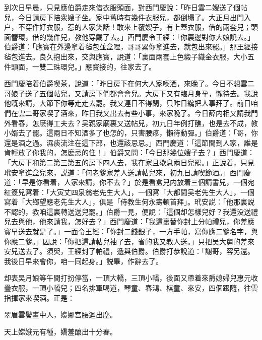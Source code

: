 到次日早晨，只見應伯爵走來借衣服頭面，對西門慶說：「昨日雲二嫂送了個帖兒，今日請房下陪衆嫂子坐。家中舊時有幾件衣服兒，都倒塌了。大正月出門入户，不穿件好衣服，惹的人家笑話！敢來上覆嫂子，有上蓋衣服，借的兩套兒；頭面簪環，借的幾件兒，教他穿戴了去。」西門慶令王經：「你裏邊對你大娘說去。」伯爵道：「應寳在外邊拿着毡包並盒哩，哥哥累你拿進去，就包出來罷。」那王經接毡包進去。良久抱出來，交與應寳，說道：「裏面兩套上色緞子織金衣服，大小五件頭面，一雙二珠環兒。」應寳接的，往家去了。

西門慶陪着伯爵喫茶，說道：「昨日房下在何大人家喫酒，來晚了。今日不想雲二哥娘子送了五個帖兒，又請房下們都會會兒。大房下又有臨月身孕，懶待去。我說他旣來請，大節下你等走走去罷。我又連日不得閑，只昨日纔把人事拜了。前日咱們在雲二哥家喫了酒來，昨日我又出去有些小事，來家晚了。今日薛内相又請我門外看春，怎麽得工夫去？吴親家廟裏又送帖兒，初九日年例打醮，也是去不成，教小婿去了罷。這兩日不知酒多了也怎的，只害腰疼，懶待動彈。」伯爵道：「哥，你還是酒之過。濕痰流注在這下部，也還該忌忌。」西門慶道：「這節間到人家，誰是肯輕放了你我的，怎麽忌的住！」伯爵又問：「今日那幾位嫂子去？」西門慶道：「大房下和第二第三第五的房下四人去，我在家且歇息兩日兒罷。」正說着，只見玳安拿進盒兒來，説道：「何老爹家差人送請帖兒來，初九日請喫節酒。」西門慶道：「早是你看着，人家來請，你不去？」於是看盒兒内放着三個請書兒，一個宛紅簽兒寫着：「大寅丈四泉翁老先生大人」，一個寫「大都閫吴老先生大人」，一個寫着「大鄉望應老先生大人」，俱是「侍教生何永壽頓首拜」。玳安説：「他那裏説不認的，教咱這裏轉送送兒罷。」伯爵一見，便說：「這個却怎樣兒好？我還没送禮兒去與他，他來請我，怎好去？」西門慶道：「我這裏替你封上分帕禮兒，你差應寳早送去就是了。」一面令王經：「你封二錢銀子，一方手帕，寫你應二爹名字，與你應二爹。」因說：「你把這請帖兒袖了去，省的我又教人送。」只把吴大舅的差來安兒送去了。須臾，王經封了帕禮，遞與伯爵。伯爵打恭說道：「謝哥，容另還。我後日早來會你，咱一同起身。」説畢，作辭去了。

却表吴月娘等午間打扮停當，一頂大轎，三頂小轎，後面又帶着來爵媳婦兒惠元收疊衣服，一頂小轎兒；四名排軍喝道，琴童、春鴻、棋童、來安，四個跟隨，往雲指揮家來喫酒。正是：　

\begin{myquote}
翠眉雲鬢畫中人，嬝娜宫腰迴出塵。

天上嫦娥元有種，嬌羞釀出十分春。
\end{myquote}

